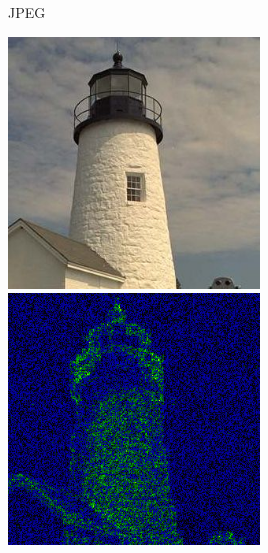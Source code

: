 \documentclass{beamer}
\begin{document}
\begin{frame}{JPEG}
   \begin{multicols}{2}
      \includegraphics[width=0.5\textwidth]{figure/JPEG_lighthouse050.jpg}
      \includegraphics[width=0.5\textwidth]{figure/psnr_JPEG_lighthouse050.png}
   \end{multicols}
\end{frame}
\end{document}
